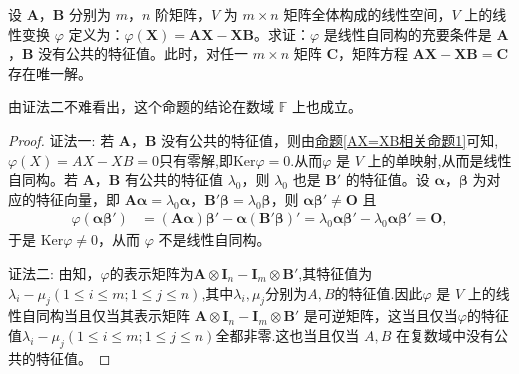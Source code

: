 \documentclass[../../main.tex]{subfiles}%
\begin{document}
\begin{proposition}\label{proposition:AX-XB相关命题1}
设 \(\boldsymbol{A}\)，\(\boldsymbol{B}\) 分别为 \(m\)，\(n\) 阶矩阵，\(V\) 为 \(m\times n\) 矩阵全体构成的线性空间，\(V\) 上的线性变换 \(\varphi\) 定义为：\(\varphi(\boldsymbol{X}) = \boldsymbol{AX - XB}\)。求证：\(\varphi\) 是线性自同构的充要条件是 \(\boldsymbol{A}\)，\(\boldsymbol{B}\) 没有公共的特征值。此时，对任一 \(m\times n\) 矩阵 \(\boldsymbol{C}\)，矩阵方程 \(\boldsymbol{AX - XB = C}\) 存在唯一解。
\end{proposition}
\begin{remark}
由{\color{blue}证法二}不难看出，这个命题的结论在数域 $\mathbb{F}$ 上也成立。
\end{remark}
\begin{proof}

{\color{blue}证法一:}
若 \(\boldsymbol{A}\)，\(\boldsymbol{B}\) 没有公共的特征值，则由\hyperref[AX=XB相关命题1]{命题\ref{AX=XB相关命题1}}可知,$\varphi(X)=AX-XB=0$只有零解,即$\mathrm{Ker}\varphi= 0$.从而\(\varphi\) 是 \(V\) 上的单映射,从而是线性自同构。若 \(\boldsymbol{A}\)，\(\boldsymbol{B}\) 有公共的特征值 \(\lambda_0\)，则 \(\lambda_0\) 也是 \(\boldsymbol{B}'\) 的特征值。设 \(\boldsymbol{\alpha}\)，\(\boldsymbol{\beta}\) 为对应的特征向量，即 \(\boldsymbol{A\alpha}=\lambda_0\boldsymbol{\alpha}\)，\(\boldsymbol{B}'\boldsymbol{\beta}=\lambda_0\boldsymbol{\beta}\)，则 \(\boldsymbol{\alpha\beta}'\neq\boldsymbol{O}\) 且
\begin{align*}
\varphi(\boldsymbol{\alpha\beta}')&=(\boldsymbol{A\alpha})\boldsymbol{\beta}' - \boldsymbol{\alpha}(\boldsymbol{B}'\boldsymbol{\beta})'=\lambda_0\boldsymbol{\alpha\beta}' - \lambda_0\boldsymbol{\alpha\beta}'=\boldsymbol{O},
\end{align*}
于是 \(\mathrm{Ker}\varphi\neq 0\)，从而 \(\varphi\) 不是线性自同构。

{\color{blue}证法二:}
由知，$\varphi$的表示矩阵为$\boldsymbol{A} \otimes \boldsymbol{I}_n - \boldsymbol{I}_m \otimes \boldsymbol{B}'$,其特征值为$\lambda_i - \mu_j (1 \leqslant  i \leqslant  m; 1 \leqslant  j \leqslant  n)$,其中$\lambda_i,\mu_j$分别为$A,B$的特征值.因此$\varphi$ 是 $V$ 上的线性自同构当且仅当其表示矩阵 $\boldsymbol{A} \otimes \boldsymbol{I}_n - \boldsymbol{I}_m \otimes \boldsymbol{B}'$ 是可逆矩阵，这当且仅当$\varphi$的特征值$\lambda_i - \mu_j (1 \leqslant  i \leqslant  m; 1 \leqslant  j \leqslant  n)$全都非零.这也当且仅当 $A,B$ 在复数域中没有公共的特征值。

\end{proof}
\end{document}
